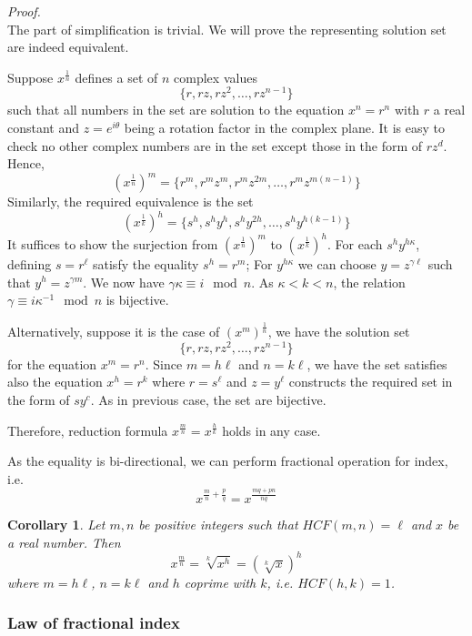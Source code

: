 \documentclass[12pt]{article}
\newtheorem*{corollary}{Corollary}
\renewenvironment{proof}[1][Proof]{\begin{snugshade*} \textit{{#1}.}\\}{\hfill \qedsymbol \end{snugshade*}}
\begin{document}
    \begin{proof}
        The part of simplification is trivial. We will prove the representing solution set are indeed equivalent.

        Suppose $x^{\frac{1}{n}}$ defines a set of $n$ complex values $$\{r,rz,rz^2,\dots,rz^{n-1}\}$$ such that all numbers in the set are solution to the equation $x^n=r^n$ with $r$ a real constant and $z=e^{i\theta}$ being a rotation factor in the complex plane. It is easy to check no other complex numbers are in the set except those in the form of $rz^d$. Hence, $$(x^{\frac{1}{n}})^m=\{r^m, r^m z^m, r^m z^{2m}, \dots, r^m z^{m(n-1)}\}$$
        Similarly, the required equivalence is the set $$(x^{\frac{1}{k}})^h=\{s^h, s^h y^h, s^h y^{2h}, \dots, s^h y^{h(k-1)}\}$$
        It suffices to show the surjection from $(x^{\frac{1}{n}})^m$ to $(x^{\frac{1}{k}})^h$. For each $s^h y^{h\kappa}$, defining $s=r^\ell$ satisfy the equality $s^h=r^m$; For $y^{h\kappa}$ we can choose $y=z^{\gamma\ell}$ such that $y^h=z^{\gamma m}$. We now have $\gamma\kappa \equiv i \mod n$. As $\kappa < k < n$, the relation $\gamma \equiv i \kappa^{-1} \mod n$ is bijective.

        Alternatively, suppose it is the case of $(x^m)^{\frac{1}{n}}$, we have the solution set $$\{r, rz, rz^2, \dots, rz^{n-1}\}$$ for the equation $x^m=r^n$. Since $m=h\ell$ and $n=k\ell$, we have the set satisfies also the equation $x^h=r^k$ where $r=s^\ell$ and $z=y^\ell$ constructs the required set in the form of $sy^c$. As in previous case, the set are bijective.
        
        Therefore, reduction formula $x^{\frac{m}{n}}=x^{\frac{h}{k}}$ holds in any case.
    \end{proof}

    As the equality is bi-directional, we can perform fractional operation for index, i.e. $$x^{\frac{m}{n}+\frac{p}{q}}=x^{\frac{mq+pn}{nq}}$$

    \begin{corollary}
        Let $m,n$ be positive integers such that $HCF(m,n)=\ell$ and $x$ be a real number.  Then $$x^{\frac{m}{n}}=\sqrt[k]{x^h}=(\sqrt[k]{x})^h$$ where $m=h\ell$, $n=k\ell$ and $h$ coprime with $k$, i.e. $HCF(h,k)=1$.
    \end{corollary}

    \subsubsection*{Law of fractional index}
\end{document}
